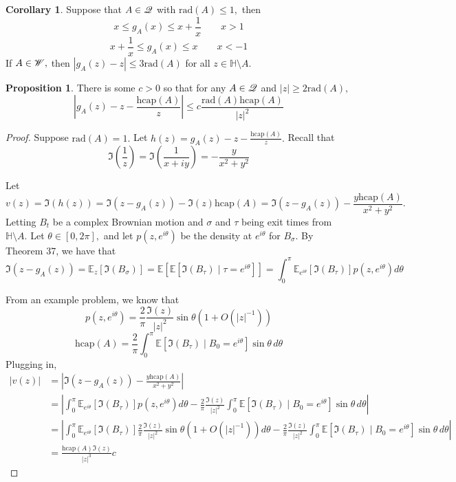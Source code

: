 \documentclass[10pt, oneside]{article}
\newcommand{\hcap}{\text{hcap}}
\newcommand{\rad}{\text{rad}}
\newcommand{\sm}{\setminus}
\theoremstyle{definition}
\newtheorem{prop}{Proposition}
\newtheorem{cor}{Corollary}
\newcommand{\bbE}{\mathbb{E}}
\newcommand{\bbH}{\mathbb{H}}
\newcommand{\sm}{\setminus}
\begin{document}
\begin{cor}
    Suppose that $A\in \cal Q$ with $\rad(A) \leq 1,$ then 
    \[x \leq g_A(x) \leq x + \frac{1}{x} \qquad x>1\]
    \[x + \frac{1}{x} \leq g_A(x) \leq x \qquad x<-1\] If $A \in \cal W,$ then $|g_A(z) - z| \leq 3\rad(A)$ for all $z\in \bbH \sm A.$ 
\end{cor}
\begin{prop}
    There is some $c>0$ so that for any $A\in \cal Q$ and $|z| \geq 2 \rad(A),$ 
    \[\left|g_A(z) - z - \frac{\hcap(A)}{z}\right| \leq c \frac{\rad(A)\hcap (A)}{|z|^2}\]
\end{prop}
\begin{proof}
    Suppose $\rad(A) = 1.$ Let $h(z) = g_A(z) - z - \frac{\hcap(A)}{z}.$ Recall that 
    \[\Im(\frac{1}{z}) = \Im(\frac{1}{x+ iy}) = -\frac{y}{x^2 + y^2}\]
    
    Let 
    \[v(z) = \Im(h(z)) = \Im(z - g_A(z)) - \Im(z)\hcap(A) = \Im(z - g_A(z)) - \frac{y\hcap(A)}{x^2 + y^2}.\] Letting $B_t$ be a complex Brownian motion and $\sigma$ and $\tau$ being exit times from $\bbH \sm A.$ Let $\theta \in [0,2\pi],$ and let $p(z, e^{i\theta})$ be the density at $e^{i\theta}$ for $B_\sigma.$ By Theorem 37, we have that 
    \[\Im(z - g_A(z)) = \bbE_z[\Im(B_\sigma)] = \bbE[\bbE[\Im(B_\tau )\mid \tau = e^{i\theta}]] = \int_0^\pi \bbE_{e^{i\theta}}[\Im(B_\tau)]p(z, e^{i\theta})d\theta\]


    From an example problem, we know that 
    \[p(z, e^{i\theta}) = \frac{2}{\pi}\frac{\Im(z )}{|z|^2}\sin\theta (1 + O(|z|^{-1}))\]
    \[\hcap(A)  = \frac{2}{\pi} \int_0^\pi \bbE[\Im{(B_\tau)\mid B_0 = e^{i\theta}}] \sin \theta \,d\theta\] Plugging in, 
    \begin{align*}
        |v(z)| &= \left|\Im(z - g_A(z)) - \frac{y\hcap(A)}{x^2 + y^2}\right|\\
        &= \left|\int_0^\pi \bbE_{e^{i\theta}}[\Im(B_\tau)]p(z, e^{i\theta})d\theta - \frac{2}{\pi}\frac{\Im(z)}{|z|^2}\int_0^\pi \bbE[\Im{(B_\tau)\mid B_0 = e^{i\theta}}] \sin \theta \,d\theta\right|\\
        &=\left|\int_0^\pi \bbE_{e^{i\theta}}[\Im(B_\tau)]\frac{2}{\pi}\frac{\Im(z )}{|z|^2}\sin\theta (1 + O(|z|^{-1}))d\theta - \frac{2}{\pi}\frac{\Im(z)}{|z|^2}\int_0^\pi \bbE[\Im{(B_\tau)\mid B_0 = e^{i\theta}}] \sin \theta \,d\theta\right|\\
        &=\frac{\hcap(A)\Im(z)}{|z|^3}c
    \end{align*}
\end{proof}
\end{document}
